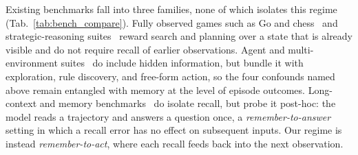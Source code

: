 \documentclass{llmxive}
\begin{document}
Existing benchmarks fall into three families, none of which isolates this regime (Tab.~\ref{tab:bench_compare}). Fully observed games such as Go and chess~\citep{silver2018general} and strategic-reasoning suites~\citep{costarelli2024gamebench, duan2024gtbench} reward search and planning over a state that is already visible and do not require recall of earlier observations. Agent and multi-environment suites~\citep{liu2023agentbench, wu2024smartplay, paglieri2024balrog, light2023avalonbench, hu2025lmgamebench, ouyang2026gameworld, pan2023machiavelli, chalamalasetti2023clembench, guertler2025textarena} do include hidden information, but bundle it with exploration, rule discovery, and free-form action, so the four confounds named above remain entangled with memory at the level of episode outcomes. Long-context and memory benchmarks~\citep{bai2023longbench, hsieh2024ruler, maharana2024locomo, wu2024longmemeval, li2026emembench, creation_2025_ICCV} do isolate recall, but probe it post-hoc: the model reads a trajectory and answers a question once, a \emph{remember-to-answer} setting in which a recall error has no effect on subsequent inputs. Our regime is instead \emph{remember-to-act}, where each recall feeds back into the next observation.
\end{document}
